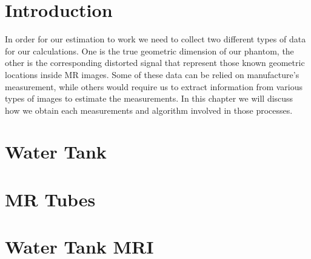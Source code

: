 \section{Introduction}
In order for our estimation to work we need to collect two different types of data for our calculations. 
One is the true geometric dimension of our phantom, the other is the corresponding distorted signal that
represent those known geometric locations inside MR images. Some of these data can be relied on manufacture's
measurement, while others would require us to extract information from various types of images to estimate the
measurements. In this chapter we will discuss how we obtain each measurements and algorithm involved in those
processes.

\section{Water Tank}
\label{ct_tank}


\section{MR Tubes}
\label{tubes}


\section{Water Tank MRI}
\label{mri_tank}

